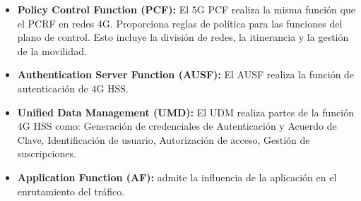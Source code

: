\begin{itemize}
\begin{itemize}
	\item  \textbf{Policy Control Function (PCF):} El 5G PCF realiza la misma función que el PCRF en redes 4G. Proporciona reglas de política para las funciones del plano de control. Esto incluye la división de redes, la itinerancia y la gestión de la movilidad.
	\item \textbf{Authentication Server Function (AUSF):} El AUSF realiza la función de autenticación de 4G HSS.
	\item \textbf{Unified Data Management (UMD):} El UDM realiza partes de la función 4G HSS como: Generación de credenciales de Autenticación y Acuerdo de Clave, Identificación de usuario, Autorización de acceso, Gestión de suscripciones.
	\item \textbf{Application Function (AF):} admite la influencia de la aplicación en el enrutamiento del tráfico.
 	\end{itemize}
\end{itemize}


